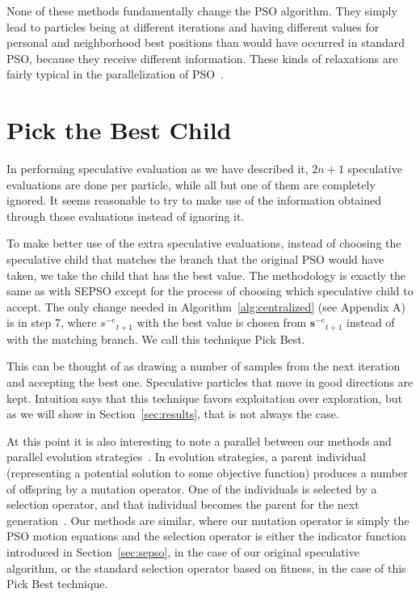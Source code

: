 \documentclass[ms,electronic,twosidetoc,letterpaper,chaptercenter,parttop,equalmargins]{byumsphd}
\renewcommand{\sec}[1]{Section~\ref{sec:#1}}
\newcommand{\alg}[1]{Algorithm~\ref{alg:#1}}
\providecommand{\noeval}[1]{\ensuremath{#1^{-e}}}
\providecommand{\s}{\ensuremath{s}}
\providecommand{\sset}{\ensuremath{\mathbf{s}}}
\begin{document}
None of these methods fundamentally change the PSO algorithm.  They simply lead
to particles being at different iterations and having different values for
personal and neighborhood best positions than would have occurred in standard
PSO, because they receive different information.  These kinds of relaxations
are fairly typical in the parallelization of
PSO~\citep{koh-2006-parallel-asynchronous-pso}.

\section{Pick the Best Child}
\label{sec:pickbest}

In performing speculative evaluation as we have described it, $2n+1$
speculative evaluations are done per particle, while all but one of them are
completely ignored.  It seems reasonable to try to make use of the information
obtained through those evaluations instead of ignoring it.

To make better use of the extra speculative evaluations, instead of choosing
the speculative child that matches the branch that the original PSO would have
taken, we take the child that has the best value.  The methodology is exactly
the same as with SEPSO except for the process of choosing which speculative
child to accept.  The only change needed in \alg{centralized} (see Appendix A)
is in step 7, where $\noeval{\s}_{t+1}$ with the best value is chosen from
$\noeval{\sset}_{t+1}$ instead of with the matching branch.  We call this
technique Pick Best.

This can be thought of as drawing a number of samples from the next iteration
and accepting the best one.  Speculative particles that move in good directions
are kept.  Intuition says that this technique favors exploitation over
exploration, but as we will show in \sec{results}, that is not always the case.

At this point it is also interesting to note a parallel between our methods and
parallel evolution
strategies~\citep{rudolph-1991-distributed-evolution-strategies}.  In evolution
strategies, a parent individual (representing a potential solution to some
objective function) produces a number of offspring by a mutation operator.  One
of the individuals is selected by a selection operator, and that individual
becomes the parent for the next
generation~\citep{beyer-2002-evolution-strategies}.  Our methods are similar,
where our mutation operator is simply the PSO motion equations and the
selection operator is either the indicator function introduced in \sec{sepso},
in the case of our original speculative algorithm, or the standard selection
operator based on fitness, in the case of this Pick Best technique.
\end{document}
